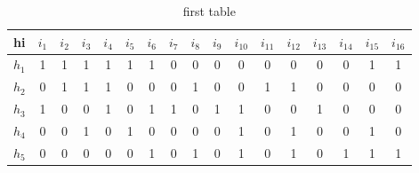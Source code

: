 \begin{table}[h!]
	\centering
		\caption{first table}
		\begin{tabular}{l|cccc cccc cccc cccc}
			\toprule
hi    & $i_1$ & $i_2$ & $i_3$ & $i_4$ & $i_5$ & $i_6$ & $i_7$ & $i_8$ & $i_9$ & $i_{10}$ & $i_{11}$ & $i_{12}$ & $i_{13}$ & $i_{14}$ & $i_{15}$ & $i_{16}$ \\
			\midrule
$h_1$ & 1  & 1 & 1  & 1  & 1 & 1 & 0 & 0  & 0 & 0 & 0 & 0  & 0 & 0  & 1 & 1 \\
$h_2$ & 0  & 1 & 1  & 1  & 0 & 0 & 0 & 1  & 0 & 0 & 1 & 1  & 0 & 0  & 0 & 0 \\
$h_3$ & 1  & 0 & 0  & 1  & 0 & 1 & 1 & 0  & 1 & 1 & 0 & 0  & 1 & 0  & 0 & 0 \\
$h_4$ & 0  & 0 & 1  & 0  & 1 & 0 & 0 & 0  & 0 & 1 & 0 & 1  & 0 & 0  & 1 & 0 \\
$h_5$ & 0  & 0 & 0  & 0  & 0 & 1 & 0 & 1  & 0 & 1 & 0 & 1  & 0 & 1  & 1 & 1 \\
			\bottomrule
		\end{tabular}
\end{table}

